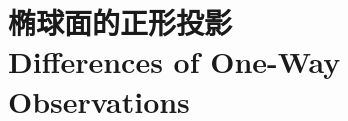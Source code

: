 \documentclass[a4paper,12pt]{book}
\begin{document}
	
	\chapter[椭球面的正形投影]{椭球面的正形投影\\Differences of One-Way Observations}
	\minitoc %
	\newpage%
		
		
		
		
		
		
		
	

\backmatter
\end{document}
